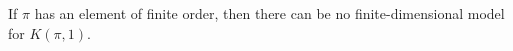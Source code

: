 If $\pi$ has an element of finite order, then there can be no finite-dimensional model for $K(\pi, 1)$.
